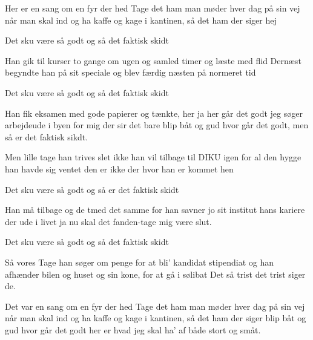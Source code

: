 \documentclass[a4paper,11pt]{article}
\begin{document}
\begin{song}

%
Her er en sang om en fyr der hed Tage
det ham man møder hver dag på sin vej
når man skal ind og ha kaffe og kage
i kantinen, så det ham der siger hej

Det sku være så godt og så det faktisk skidt


%
Han gik til kurser to gange om ugen
og samled timer og læste med flid
Dernæst begyndte han på sit speciale
og blev færdig næsten på normeret tid

Det sku være så godt og så det faktisk skidt


%
Han fik eksamen med gode papierer
og tænkte, her ja her går det godt
jeg søger arbejdeude i byen
for mig der sir det bare blip båt
og gud hvor går det godt,
men så er det faktisk sikdt.


%
Men lille tage han trives slet ikke
han vil tilbage til DIKU igen
for al den hygge han havde sig ventet
den er ikke der hvor han er kommet hen

Det sku være så godt og så er det faktisk skidt


%
Han må tilbage og de tmed det samme
for han savner jo sit institut
hans kariere der ude i livet
ja nu skal det fanden-tage mig være slut.

Det sku være så godt og så det faktisk skidt


%
Så vores Tage han søger om penge
for at bli' kandidat stipendiat
og han afhænder bilen og huset
og sin kone, for at gå i sølibat
Det så trist det trist siger de.

%
Det var en sang om en fyr der hed Tage
det ham man møder hver dag på sin vej
når man skal ind og ha kaffe og kage
i kantinen, så det ham der siger
blip båt og gud hvor går det godt
her er hvad jeg skal ha' af både
stort og småt.
\end{song}
\end{document}
